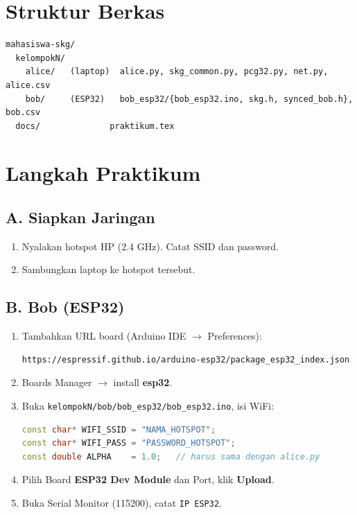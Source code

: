 \documentclass[11pt,a4paper]{article}
\begin{document}
\section{Struktur Berkas}
\begin{lstlisting}
mahasiswa-skg/
  kelompokN/
    alice/   (laptop)  alice.py, skg_common.py, pcg32.py, net.py, alice.csv
    bob/     (ESP32)   bob_esp32/{bob_esp32.ino, skg.h, synced_bob.h}, bob.csv
  docs/              praktikum.tex
\end{lstlisting}

\section{Langkah Praktikum}

\subsection{A. Siapkan Jaringan}
\begin{enumerate}[noitemsep]
  \item Nyalakan hotspot HP (2.4 GHz). Catat SSID dan password.
  \item Sambungkan laptop ke hotspot tersebut.
\end{enumerate}

\subsection{B. Bob (ESP32)}
\begin{enumerate}[noitemsep]
  \item Tambahkan URL board (Arduino IDE $\to$ Preferences):
  \begin{lstlisting}
https://espressif.github.io/arduino-esp32/package_esp32_index.json
  \end{lstlisting}
  \item Boards Manager $\to$ install \textbf{esp32}.
  \item Buka \texttt{kelompokN/bob/bob\_esp32/bob\_esp32.ino}, isi WiFi:
  \begin{lstlisting}[language=C++]
const char* WIFI_SSID = "NAMA_HOTSPOT";
const char* WIFI_PASS = "PASSWORD_HOTSPOT";
const double ALPHA    = 1.0;   // harus sama dengan alice.py
  \end{lstlisting}
  \item Pilih Board \textbf{ESP32 Dev Module} dan Port, klik \textbf{Upload}.
  \item Buka Serial Monitor (115200), catat \texttt{IP ESP32}.
\end{enumerate}
\end{document}
